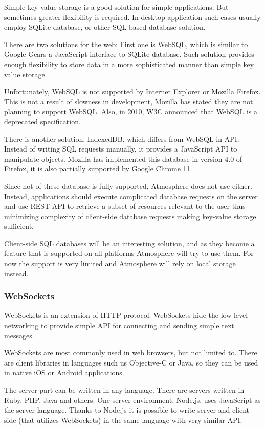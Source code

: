 Simple key value storage is a good solution for simple applications. But sometimes greater flexibility is required. In desktop application such cases usually employ SQLite database, or other SQL based database solution. 

There are two solutions for the web: First one is WebSQL, which is similar to Google Gears a JavaScript interface to SQLite database. Such solution provides enough flexibility to store data in a more sophisticated manner than simple key value storage.

Unfortunately, WebSQL is not supported by Internet Explorer or Mozilla Firefox. This is not a result of slowness in development, Mozilla has stated they are not planning to support WebSQL. \citep{mozilla_indexeddb} Also, in 2010, W3C announced that WebSQL is a deprecated specification. \citep{w3c_webdatabase}

There is another solution, IndexedDB, which differs from WebSQL in API. Instead of writing SQL requests manually, it provides a JavaScript API to manipulate objects. Mozilla has implemented this database in version 4.0 of Firefox, it is also partially supported by Google Chrome 11.

Since not of these database is fully supported, Atmosphere does not use either. Instead, applications should execute complicated database requests on the server and use REST API to retrieve a subset of resources relevant to the user thus minimizing complexity of client-side database requests making key-value storage sufficient.

Client-side SQL databases will be an interesting solution, and as they become a feature that is supported on all platforms Atmosphere will try to use them. For now the support is very limited and Atmosphere will rely on local storage instead.

\subsubsection{WebSockets}

WebSockets is an extension of HTTP protocol. WebSockets hide the low level networking to provide simple API for connecting and sending simple text messages. 

WebSockets are most commonly used in web browsers, but not limited to. There are client libraries in languages such us Objective-C or Java, so they can be used in native iOS or Android applications.

The server part can be written in any language. There are servers written in Ruby, PHP, Java and others. One server environment, Node.js, uses JavaScript as the server language. Thanks to Node.js it is possible to write server and client side (that utilizes WebSockets) in the same language with very similar API.

